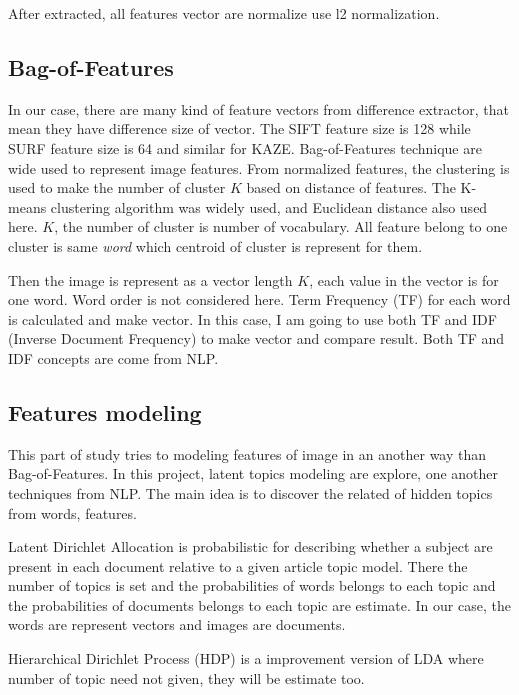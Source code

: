 \documentclass[12pt]{article}
\begin{document}
After extracted, all features vector are normalize use l2 normalization.

\subsection{Bag-of-Features}
In our case, there are many kind of feature vectors from difference extractor, that mean they have difference size of vector.
The SIFT feature size is 128 while SURF feature size is 64 and similar for KAZE.
Bag-of-Features technique are wide used to represent image features.
From normalized features, the clustering is used to make the number of cluster $K$ based on distance of features.
The K-means clustering algorithm \cite{hartigan1979algorithm} was widely used, and Euclidean distance also used here.
$K$, the number of cluster is number of vocabulary.
All feature belong to one cluster is same \textit{word} which centroid of cluster is represent for them.

Then the image is represent as a vector length $K$, each value in the vector is for one word.
Word order is not considered here.
Term Frequency (TF) for each word is calculated and make vector.
In this case, I am going to use both TF and IDF (Inverse Document Frequency) to make vector and compare result.
Both TF and IDF concepts are come from NLP.


\subsection{Features modeling}
This part of study tries to modeling features of image in an another way than Bag-of-Features.
In this project, latent topics modeling are explore, one another techniques from NLP.
The main idea is to discover the related of hidden topics from words, features.

Latent Dirichlet Allocation \cite{blei2003latent, Blei2003} is probabilistic for describing whether a subject are present in each document relative to a given article topic model.
There the number of topics is set and the probabilities of words belongs to each topic and the probabilities of documents belongs to each topic are estimate.
In our case, the words are represent vectors and images are documents.

Hierarchical Dirichlet Process \cite{teh2005sharing} (HDP) is a improvement version of LDA where number of topic need not given, they will be estimate too.
\end{document}
